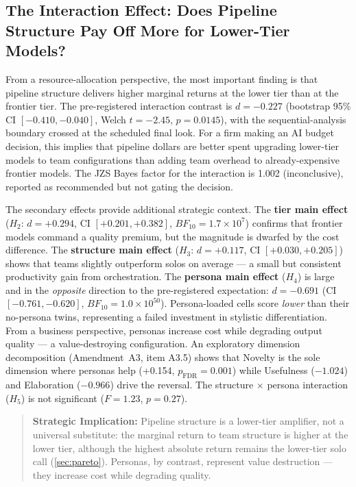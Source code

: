 \documentclass[12pt,a4paper]{article}
\newcommand{\BF}{\ensuremath{\mathit{BF}}}
\begin{document}
\subsection{The Interaction Effect: Does Pipeline Structure Pay Off More for
Lower-Tier Models?}\label{sec:interaction}

From a resource-allocation perspective, the most important finding is that
pipeline structure delivers higher marginal returns at the lower tier than at
the frontier tier. The pre-registered interaction contrast is $d = -0.227$
(bootstrap 95\% CI $[-0.410, -0.040]$, Welch $t = -2.45$, $p = 0.0145$), with
the sequential-analysis boundary crossed at the scheduled final look. For a
firm making an AI budget decision, this implies that pipeline dollars are better
spent upgrading lower-tier models to team configurations than adding team overhead to
already-expensive frontier models. The JZS Bayes factor for the interaction is
1.002 (inconclusive), reported as recommended but not gating the decision.

The secondary effects provide additional strategic context. The \textbf{tier
main effect} ($H_2$: $d = +0.294$, CI $[+0.201, +0.382]$, $\BF_{10} = 1.7 \times
10^7$) confirms that frontier models command a quality premium, but the
magnitude is dwarfed by the cost difference. The \textbf{structure main effect}
($H_3$: $d = +0.117$, CI $[+0.030, +0.205]$) shows that teams slightly outperform
solos on average --- a small but consistent productivity gain from
orchestration. The \textbf{persona main effect} ($H_4$) is large and in the
\emph{opposite} direction to the pre-registered expectation: $d = -0.691$ (CI
$[-0.761, -0.620]$, $\BF_{10} = 1.0 \times 10^{50}$). Persona-loaded cells
score \emph{lower} than their no-persona twins, representing a failed
investment in stylistic differentiation. From a business perspective, personas
increase cost while degrading output quality --- a value-destroying
configuration. An exploratory dimension decomposition (Amendment~A3, item
A3.5) shows that Novelty is the sole
dimension where personas help (+0.154, $p_{\mathrm{FDR}} = 0.001$) while
Usefulness ($-1.024$) and Elaboration ($-0.966$) drive the reversal. The
structure $\times$ persona interaction ($H_5$) is not significant ($F = 1.23$, $p =
0.27$).

\begin{quote}
\textbf{Strategic Implication:} Pipeline structure is a lower-tier amplifier,
not a universal substitute: the marginal return to team structure is higher at
the lower tier, although the highest absolute return remains the lower-tier
solo call (\cref{sec:pareto}). Personas, by
contrast, represent value destruction --- they increase cost while degrading
quality.
\end{quote}
\end{document}
